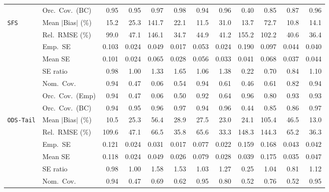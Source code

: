 \begin{landscape}
\begin{longtable}{llrrrrrrrrrr}
 & Orc.\ Cov.\ (BC) & \cellcolor{rankone}0.95 & \cellcolor{ranktwo}0.95 & 0.97 & 0.98 & 0.94 & \cellcolor{rankthree}0.96 & 0.40 & 0.85 & 0.87 & 0.96 \\
\addlinespace[2pt]
\quad \texttt{SFS} & Mean $|$Bias$|$ (\%) & 15.2 & 25.3 & 141.7 & 22.1 & \cellcolor{ranktwo}11.5 & 31.0 & \cellcolor{rankthree}13.7 & 72.7 & \cellcolor{rankone}10.8 & 14.1 \\
 & Rel.\ RMSE (\%) & 99.0 & 47.1 & 146.1 & \cellcolor{rankone}34.7 & 44.9 & 41.2 & 155.2 & 102.2 & \cellcolor{rankthree}40.6 & \cellcolor{ranktwo}36.4 \\
 & Emp.\ SE & 0.103 & 0.024 & 0.049 & 0.017 & 0.053 & 0.024 & 0.190 & 0.097 & 0.044 & 0.040 \\
 & Mean SE & 0.101 & 0.024 & 0.065 & 0.028 & 0.056 & 0.033 & 0.041 & 0.068 & 0.037 & 0.044 \\
 & SE ratio & \cellcolor{ranktwo}0.98 & \cellcolor{rankone}1.00 & 1.33 & 1.65 & \cellcolor{rankthree}1.06 & 1.38 & 0.22 & 0.70 & 0.84 & 1.10 \\
 & Nom.\ Cov. & \cellcolor{ranktwo}0.94 & 0.47 & 0.06 & 0.54 & \cellcolor{rankone}0.94 & 0.61 & 0.46 & 0.61 & 0.82 & \cellcolor{rankthree}0.94 \\
 & Orc.\ Cov.\ (Emp) & \cellcolor{ranktwo}0.94 & 0.47 & 0.06 & 0.50 & 0.92 & 0.64 & \cellcolor{rankone}0.96 & 0.80 & \cellcolor{rankthree}0.93 & 0.93 \\
 & Orc.\ Cov.\ (BC) & \cellcolor{rankthree}0.94 & \cellcolor{rankone}0.95 & 0.96 & 0.97 & \cellcolor{ranktwo}0.94 & 0.96 & 0.44 & 0.85 & 0.86 & 0.97 \\
\addlinespace[2pt]
\quad \texttt{ODS-Tail} & Mean $|$Bias$|$ (\%) & \cellcolor{rankone}10.5 & 25.3 & 56.4 & 28.9 & 27.5 & \cellcolor{rankthree}23.0 & 24.1 & 105.4 & 46.5 & \cellcolor{ranktwo}13.0 \\
 & Rel.\ RMSE (\%) & 109.6 & 47.1 & 66.5 & \cellcolor{ranktwo}35.8 & 65.6 & \cellcolor{rankone}33.3 & 148.3 & 144.3 & 65.2 & \cellcolor{rankthree}36.3 \\
 & Emp.\ SE & 0.121 & 0.024 & 0.031 & 0.017 & 0.077 & 0.022 & 0.159 & 0.168 & 0.043 & 0.042 \\
 & Mean SE & 0.118 & 0.024 & 0.049 & 0.026 & 0.079 & 0.028 & 0.039 & 0.175 & 0.035 & 0.047 \\
 & SE ratio & \cellcolor{ranktwo}0.98 & \cellcolor{rankone}1.00 & 1.58 & 1.53 & \cellcolor{rankthree}1.03 & 1.27 & 0.25 & 1.04 & 0.81 & 1.12 \\
 & Nom.\ Cov. & \cellcolor{rankthree}0.94 & 0.47 & 0.69 & 0.62 & \cellcolor{rankone}0.95 & 0.80 & 0.52 & 0.76 & 0.52 & \cellcolor{ranktwo}0.95 \\

\end{longtable}
\end{landscape}
